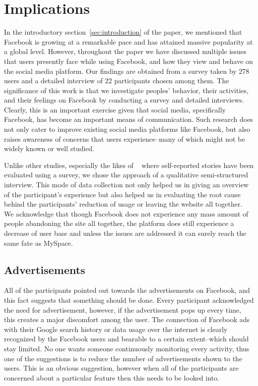\section{Implications}
\label{sec:implications}
In the introductory section~\ref{sec:introduction} of the paper, we mentioned that Facebook is growing at a remarkable pace and has attained massive popularity at a global level. However, throughout the paper we have discussed multiple issues that users presently face while using Facebook, and how they view and behave on the social media platform. Our findings are obtained from a survey taken by 278 users and a detailed interview of 22 participants chosen among them. The significance of this work is that we investigate peoples' behavior, their activities, and their feelings on Facebook by conducting a survey and detailed interviews. Clearly, this is an important exercise given that social media, specifically Facebook, has become an important means of communication. Such research does not only cater to improve existing social media platforms like Facebook, but also raises awareness of concerns that users experience--many of which might not be widely known or well studied. 

Unlike other studies, especially the likes of ~\cite{baumer2013limiting} where self-reported stories have been evaluated using a survey, we chose the approach of a qualitative semi-structured interview. This mode of data collection not only helped us in giving an overview of the participant's experience but also helped us in evaluating the root cause behind  the participants' reduction of usage or leaving the website all together. We acknowledge that though Facebook does not experience any mass amount of people abandoning the site all together, the platform does still experience a decrease of user base and unless the issues are addressed it can surely reach the same fate as MySpace.

\subsection{Advertisements}
All of the participants pointed out towards the advertisements on Facebook, and this fact suggests that something should be done. Every participant acknowledged the need for advertisement, however, if the advertisement pops up every time, this creates a major discomfort among the user. The connection of Facebook ads with their Google search history or data usage over the internet is clearly recognized by the Facebook users and bearable to a certain extent--which should stay limited. No one wants someone continuously monitoring every activity, thus one of the suggestions is to reduce the number of advertisements shown to the users. This is an obvious suggestion, however when all of the participants are concerned about a particular feature then this needs to be looked into.
